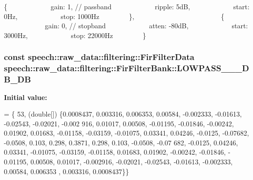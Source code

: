 \{             gain\+: 1, // passband             ripple\+: 5d\+B,             start\+: 0\+Hz,             stop\+: 1000\+Hz         \},                          \{             gain\+: 0, // stopband             atten\+: -\/80d\+B,             start\+: 3000\+Hz,             stop\+: 22000\+Hz         \} \hypertarget{classspeech_1_1raw__data_1_1filtering_1_1FirFilterBank_a4bd8bcb62eeeb42a4c0fbcf745211af5}{
\subsubsection[{L\+O\+W\+P\+A\+S\+S\+\_\+44100\+\_\+8000\+\_\+3\+D\+B\+\_\+80\+D\+B}]{\setlength{\rightskip}{0pt plus 5cm}const {\bf speech\+::raw\+\_\+data\+::filtering\+::\+Fir\+Filter\+Data} speech\+::raw\+\_\+data\+::filtering\+::\+Fir\+Filter\+Bank\+::\+L\+O\+W\+P\+A\+S\+S\+\_\+\_\+\_\+D\+B\+\_\+D\+B\hspace{0.3cm}{\ttfamily [static]}}}\label{classspeech_1_1raw__data_1_1filtering_1_1FirFilterBank_a4bd8bcb62eeeb42a4c0fbcf745211af5}
{\bfseries Initial value\+:}
\begin{DoxyCode}
= \{
        53,
        (\textcolor{keywordtype}{double}[]) \{0.0008437, 0.003316, 0.006353, 0.00584, -0.002333, -0.01613, -0.02543, -0.02021, -0.002
      916, 0.01017,
                    0.00508, -0.01195, -0.01846, -0.00242, 0.01902, 0.01683, -0.01158, -0.03159, -0.01075, 
      0.03341,
                    0.04246, -0.0125, -0.07682, -0.0508, 0.103, 0.298, 0.3871, 0.298, 0.103, -0.0508, -0.07
      682, -0.0125,
                    0.04246, 0.03341, -0.01075, -0.03159, -0.01158, 0.01683, 0.01902, -0.00242, -0.01846, -
      0.01195,
                    0.00508, 0.01017, -0.002916, -0.02021, -0.02543, -0.01613, -0.002333, 0.00584, 0.006353
      , 0.003316,
                    0.0008437\}\}
\end{DoxyCode}
